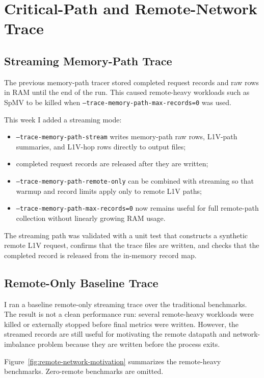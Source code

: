 \documentclass[sigconf,screen,review]{acmart}
\begin{document}
\section{Critical-Path and Remote-Network Trace}

\subsection{Streaming Memory-Path Trace}

The previous memory-path tracer stored completed request records and raw rows
in RAM until the end of the run.  This caused remote-heavy workloads such as
SpMV to be killed when \texttt{--trace-memory-path-max-records=0} was used.

This week I added a streaming mode:

\begin{itemize}
  \item \texttt{--trace-memory-path-stream} writes memory-path raw rows,
  L1V-path summaries, and L1V-hop rows directly to output files;
  \item completed request records are released after they are written;
  \item \texttt{--trace-memory-path-remote-only} can be combined with streaming
  so that warmup and record limits apply only to remote L1V paths;
  \item \texttt{--trace-memory-path-max-records=0} now remains useful for full
  remote-path collection without linearly growing RAM usage.
\end{itemize}

The streaming path was validated with a unit test that constructs a synthetic
remote L1V request, confirms that the trace files are written, and checks that
the completed record is released from the in-memory record map.

\subsection{Remote-Only Baseline Trace}

I ran a baseline remote-only streaming trace over the traditional benchmarks.
The result is not a clean performance run: several remote-heavy workloads were
killed or externally stopped before final metrics were written.  However, the
streamed records are still useful for motivating the remote datapath and
network-imbalance problem because they are written before the process exits.

Figure~\ref{fig:remote-network-motivation} summarizes the remote-heavy
benchmarks.  Zero-remote benchmarks are omitted.
\end{document}
